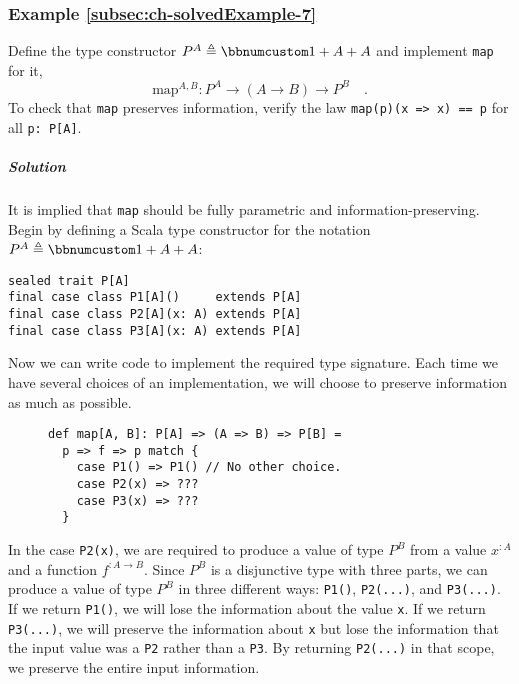 \subsubsection{Example \label{subsec:ch-solvedExample-7}\ref{subsec:ch-solvedExample-7}}

Define the type constructor $P^{A}\triangleq\bbnum 1+A+A$ and implement
\lstinline!map! for it,
\[
\text{map}^{A,B}:P^{A}\rightarrow(A\rightarrow B)\rightarrow P^{B}\quad.
\]
To check that \lstinline!map! preserves information, verify the law
\lstinline!map(p)(x => x) == p! for all \lstinline!p: P[A]!.

\subparagraph{Solution}

It is implied that \lstinline!map! should be fully parametric and
information-preserving. Begin by defining a Scala type constructor
for the notation $P^{A}\triangleq\bbnum 1+A+A$:
\begin{lstlisting}
sealed trait P[A]
final case class P1[A]()     extends P[A]
final case class P2[A](x: A) extends P[A]
final case class P3[A](x: A) extends P[A]
\end{lstlisting}
Now we can write code to implement the required type signature. Each
time we have several choices of an implementation, we will choose
to preserve information as much as possible.

\begin{wrapfigure}{l}{0.45\columnwidth}%
\vspace{0.24\baselineskip}

\begin{lstlisting}
def map[A, B]: P[A] => (A => B) => P[B] =
  p => f => p match {
    case P1() => P1() // No other choice.
    case P2(x) => ???
    case P3(x) => ???
  }
\end{lstlisting}
\vspace{-0.9\baselineskip}
\end{wrapfigure}%

\noindent In the case \lstinline!P2(x)!, we are required to produce
a value of type $P^{B}$ from a value $x^{:A}$ and a function $f^{:A\rightarrow B}$.
Since $P^{B}$ is a disjunctive type with three parts, we can produce
a value of type $P^{B}$ in three different ways: \lstinline!P1()!,
\lstinline!P2(...)!, and \lstinline!P3(...)!. If we return \lstinline!P1()!,
we will lose the information about the value \lstinline!x!. If we
return \lstinline!P3(...)!, we will preserve the information about
\lstinline!x! but lose the information that
the input value was a \lstinline!P2! rather than a \lstinline!P3!.
By returning \lstinline!P2(...)! in that scope, we preserve the entire
input information. 

